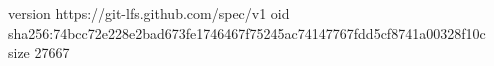 version https://git-lfs.github.com/spec/v1
oid sha256:74bcc72e228e2bad673fe1746467f75245ac74147767fdd5cf8741a00328f10c
size 27667

